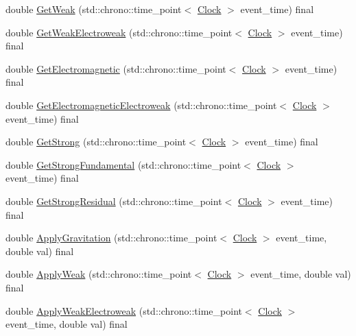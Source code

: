 \begin{DoxyCompactItemize}
double \hyperlink{class_solid_ac8a7738735a6bda4e89414a2b0c370e1}{Get\+Weak} (std\+::chrono\+::time\+\_\+point$<$ \hyperlink{universe_8h_a0ef8d951d1ca5ab3cfaf7ab4c7a6fd80}{Clock} $>$ event\+\_\+time) final
\item 
double \hyperlink{class_solid_ac98f9c827d58a631627423e25dd611ba}{Get\+Weak\+Electroweak} (std\+::chrono\+::time\+\_\+point$<$ \hyperlink{universe_8h_a0ef8d951d1ca5ab3cfaf7ab4c7a6fd80}{Clock} $>$ event\+\_\+time) final
\item 
double \hyperlink{class_solid_a01cd3c441a4e339927c43536de6d9b5e}{Get\+Electromagnetic} (std\+::chrono\+::time\+\_\+point$<$ \hyperlink{universe_8h_a0ef8d951d1ca5ab3cfaf7ab4c7a6fd80}{Clock} $>$ event\+\_\+time) final
\item 
double \hyperlink{class_solid_aff7ec13bcc584d8330e3f3a1b371bbe6}{Get\+Electromagnetic\+Electroweak} (std\+::chrono\+::time\+\_\+point$<$ \hyperlink{universe_8h_a0ef8d951d1ca5ab3cfaf7ab4c7a6fd80}{Clock} $>$ event\+\_\+time) final
\item 
double \hyperlink{class_solid_ae39d0166456b8feaa39547e5a21c9096}{Get\+Strong} (std\+::chrono\+::time\+\_\+point$<$ \hyperlink{universe_8h_a0ef8d951d1ca5ab3cfaf7ab4c7a6fd80}{Clock} $>$ event\+\_\+time) final
\item 
double \hyperlink{class_solid_ab3a972354b25ad1bbe8c3f3e7638e24c}{Get\+Strong\+Fundamental} (std\+::chrono\+::time\+\_\+point$<$ \hyperlink{universe_8h_a0ef8d951d1ca5ab3cfaf7ab4c7a6fd80}{Clock} $>$ event\+\_\+time) final
\item 
double \hyperlink{class_solid_a9cfde1c3a4b7c6d2a5a3719d74e27237}{Get\+Strong\+Residual} (std\+::chrono\+::time\+\_\+point$<$ \hyperlink{universe_8h_a0ef8d951d1ca5ab3cfaf7ab4c7a6fd80}{Clock} $>$ event\+\_\+time) final
\item 
double \hyperlink{class_solid_af2b3133138ce2482faa462d07aa23042}{Apply\+Gravitation} (std\+::chrono\+::time\+\_\+point$<$ \hyperlink{universe_8h_a0ef8d951d1ca5ab3cfaf7ab4c7a6fd80}{Clock} $>$ event\+\_\+time, double val) final
\item 
double \hyperlink{class_solid_a49e35bf258104b7bce225dc21058affb}{Apply\+Weak} (std\+::chrono\+::time\+\_\+point$<$ \hyperlink{universe_8h_a0ef8d951d1ca5ab3cfaf7ab4c7a6fd80}{Clock} $>$ event\+\_\+time, double val) final
\item 
double \hyperlink{class_solid_ad6c28ec896cbcf64e24a7132a144befd}{Apply\+Weak\+Electroweak} (std\+::chrono\+::time\+\_\+point$<$ \hyperlink{universe_8h_a0ef8d951d1ca5ab3cfaf7ab4c7a6fd80}{Clock} $>$ event\+\_\+time, double val) final

\end{DoxyCompactItemize}
